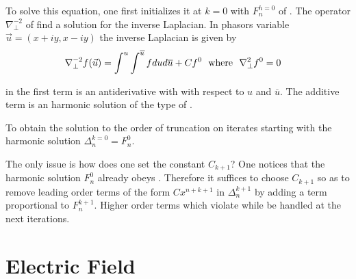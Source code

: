 %
%
To solve this equation, one first initializes it at $k=0$ with 
%
${F}_{n}^{h=
0}$
of . The operator %
${\nabla }_{\perp }^{-2}$ of  find a solution for the inverse Laplacian. In phasors variable 
%
$\vec{u}=
\left({x+iy,x-iy}\right)$
the inverse Laplacian is   given by 
%
\begin{eqnarray}{\nabla }_{\perp }^{-2}f(\vec{u})&=\int_{}^{u}\int_{}^{\overline{u}}f du d\overline{u} + C {f}^{0}~~{\text w}{\text h}{\text e}{\text r}{\text e}~~{\nabla }_{\perp }^{2}{f}^{0}=0\label{eq:inv}\end{eqnarray}
%

in  the first term is an antiderivative with with respect to $u$ and $ \overline{u}$. The additive term is an harmonic solution of the type of . 

To obtain the solution to the order of truncation on iterates  starting with the harmonic solution %
${\Delta }_{n}^{k=
0}=
{F}_{n}^{0}$.

The only issue is how does one set the constant ${C}_{k+1}$? One notices that the harmonic solution  ${F}_{n}^{0}$ already obeys . Therefore it suffices to  choose ${C}_{k+1}$ so as to remove leading order terms of the form $C x^{n+k+1}$  in ${\Delta }_{n}^{k+1}$ by adding a term proportional to ${F}_{n}^{k+1}$. Higher order terms which violate  while be handled at the next iterations.


\section{Electric Field}


